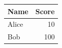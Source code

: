 \begin{tabular}{lr}
\toprule
Name & Score \\
\midrule
Alice & 10 \\
Bob & 100 \\
\bottomrule
\end{tabular}
